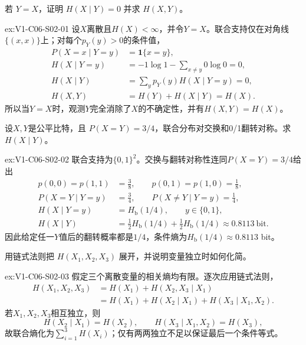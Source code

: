 \begin{SLChapterExercisePairSection}
\begin{exercise}\label{ex:V1-C06-S02-01}
若 $Y=X$，证明 $H(X\mid Y)=0$ 并求 $H(X,Y)$。
\end{exercise}
\label{sol:V1-C06-S02-01}
\begin{chapterexercisesolution}{ex:V1-C06-S02-01}
设$X$离散且$H(X)<\infty$，并令$Y=X$。联合支持仅在对角线$\{(x,x)\}$上；对每个$p_Y(y)>0$的条件值，
\[
\begin{aligned}
P(X=x\mid Y=y)&=\mathbf1\{x=y\},\\
H(X\mid Y=y)
&=-1\log1-\sum_{x\ne y}0\log0=0,\\
H(X\mid Y)&=\sum_y p_Y(y)H(X\mid Y=y)=0,\\
H(X,Y)&=H(Y)+H(X\mid Y)=H(X).
\end{aligned}
\]
所以当$Y=X$时，观测$Y$完全消除了$X$的不确定性，并有$H(X,Y)=H(X)$。
\end{chapterexercisesolution}

\begin{exercise}\label{ex:V1-C06-S02-02}
设$X,Y$是公平比特，且 $P(X=Y)=3/4$，联合分布对交换和0/1翻转对称。求 $H(X\mid Y)$。
\end{exercise}
\label{sol:V1-C06-S02-02}
\begin{chapterexercisesolution}{ex:V1-C06-S02-02}
联合支持为$\{0,1\}^2$。交换与翻转对称性连同$P(X=Y)=3/4$给出
\[
\begin{aligned}
p(0,0)=p(1,1)&=\frac38,\qquad
p(0,1)=p(1,0)=\frac18,\\
P(X=Y\mid Y=y)&=\frac34,\qquad
P(X\ne Y\mid Y=y)=\frac14,\\
H(X\mid Y=y)&=H_{\mathrm b}(1/4),\qquad y\in\{0,1\},\\
H(X\mid Y)&=\frac12H_{\mathrm b}(1/4)+\frac12H_{\mathrm b}(1/4)
\approx0.8113\ \text{bit}.
\end{aligned}
\]
因此给定任一$Y$值后的翻转概率都是$1/4$，条件熵为$H_{\mathrm b}(1/4)\approx0.8113$ bit。
\end{chapterexercisesolution}

\begin{exercise}\label{ex:V1-C06-S02-03}
用链式法则把 $H(X_1,X_2,X_3)$ 展开，并说明变量独立时如何化简。
\end{exercise}
\label{sol:V1-C06-S02-03}
\begin{chapterexercisesolution}{ex:V1-C06-S02-03}
假定三个离散变量的相关熵均有限。逐次应用链式法则，
\[
\begin{aligned}
H(X_1,X_2,X_3)
&=H(X_1)+H(X_2,X_3\mid X_1)\\
&=H(X_1)+H(X_2\mid X_1)
+H(X_3\mid X_1,X_2).
\end{aligned}
\]
若$X_1,X_2,X_3$相互独立，则
\[
H(X_2\mid X_1)=H(X_2),\qquad
H(X_3\mid X_1,X_2)=H(X_3),
\]
故联合熵化为$\sum_{i=1}^3H(X_i)$；仅有两两独立不足以保证最后一个条件等式。
\end{chapterexercisesolution}


\end{SLChapterExercisePairSection}
